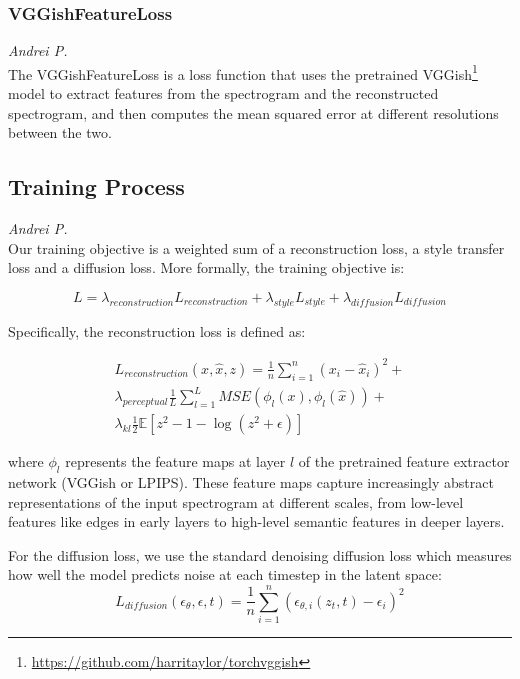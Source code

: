 \subsubsection{VGGishFeatureLoss}
\textit{Andrei P.}\\
The VGGishFeatureLoss is a loss function that uses the pretrained VGGish\footnote{\url{https://github.com/harritaylor/torchvggish}} model to extract features from the spectrogram and the reconstructed spectrogram, and then computes the mean squared error at different resolutions between the two. 


\subsection{Training Process}
\textit{Andrei P.}\\
Our training objective is a weighted sum of a reconstruction loss, a style transfer loss and a diffusion loss. More formally, the training objective is:

\begin{equation}
    L = \lambda_{reconstruction}L_{reconstruction} + \lambda_{style}L_{style} + \lambda_{diffusion}L_{diffusion}
\end{equation}

\noindent Specifically, the reconstruction loss is defined as:

\begin{equation}
    \begin{split}
    L_{reconstruction}(x, \hat{x}, z) = \frac{1}{n}\sum_{i=1}^{n}(x_i - \hat{x}_i)^2 + \\
    \lambda_{perceptual} \frac{1}{L}\sum_{l=1}^{L} MSE(\phi_l(x), \phi_l(\hat{x})) + \\
    \lambda_{kl} \frac{1}{2}\mathbb{E}[z^2 - 1 - \log(z^2 + \epsilon)]
    \end{split}
\end{equation}

\noindent where $\phi_l$ represents the feature maps at layer $l$ of the pretrained feature extractor network (VGGish or LPIPS). These feature maps capture increasingly abstract representations of the input spectrogram at different scales, from low-level features like edges in early layers to high-level semantic features in deeper layers.

\vspace{1em}

\noindent For the diffusion loss, we use the standard denoising diffusion loss which measures how well the model predicts noise at each timestep in the latent space:
\begin{equation}
L_{diffusion}(\epsilon_\theta, \epsilon, t) = \frac{1}{n}\sum_{i=1}^{n}(\epsilon_{\theta,i}(z_t, t) - \epsilon_i)^2
\end{equation}

